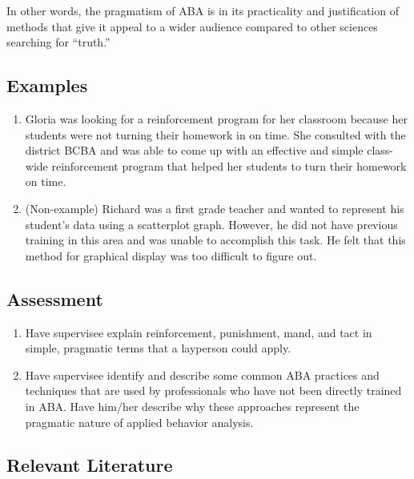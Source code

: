 In other words, the pragmatism of ABA is in its practicality and justification of methods that give it appeal to a wider audience compared to other sciences searching for ``truth.''

\subsection{Examples}
\begin{enumerate}
\item Gloria was looking for a reinforcement program for her classroom because her students were not turning their homework in on time. She consulted with the district BCBA and was able to come up with an effective and simple class-wide reinforcement program that helped her students to turn their homework on time.
\item (Non-example) Richard was a first grade teacher and wanted to represent his student's data using a scatterplot graph. However, he did not have previous training in this area and was unable to accomplish this task. He felt that this method for graphical display was too difficult to figure out.
%
\end{enumerate}
%
\subsection{Assessment}
\begin{enumerate}
\item Have supervisee explain reinforcement, punishment, mand, and tact in simple, pragmatic terms that a layperson could apply. 
\item Have supervisee identify and describe some common ABA practices and techniques that are used by professionals who have not been directly trained in ABA. Have him/her describe why these approaches represent the pragmatic nature of applied behavior analysis.  
%
\end{enumerate}
%
\subsection{Relevant Literature}
\begin{refsection}
\nocite{test,alang2017police,clayton2018black}
\printbibliography[heading=none]
\end{refsection}
%
